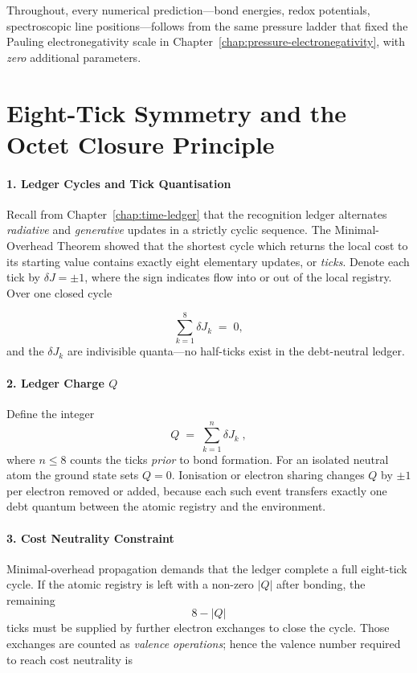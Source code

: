 \documentclass[11pt,oneside]{book}
\begin{document}
Throughout, every numerical prediction---bond energies, redox potentials,
spectroscopic line positions---follows from the same pressure ladder that
fixed the Pauling electronegativity scale in
Chapter~\ref{chap:pressure-electronegativity}, with \emph{zero} additional
parameters.

\bigskip

\section{Eight-Tick Symmetry and the Octet Closure Principle}
\label{sec:octet-proof}

\paragraph*{1. Ledger Cycles and Tick Quantisation}

Recall from Chapter~\ref{chap:time-ledger} that the recognition ledger
alternates \emph{radiative} and \emph{generative} updates in a strictly
cyclic sequence.  The Minimal-Overhead Theorem showed that the shortest
cycle which returns the local cost to its starting value contains exactly
eight elementary updates, or \emph{ticks}.  Denote each tick by
\(\delta J = \pm 1\), where the sign indicates flow into or out of the
local registry.  Over one closed cycle

\[
   \sum_{k=1}^{8} \delta J_k \;=\; 0 ,
\]
and the \(\delta J_k\) are indivisible quanta---no half-ticks exist in the
debt-neutral ledger.

\paragraph*{2. Ledger Charge \(Q\)}

Define the integer
\[
   Q \;=\; \sum_{k=1}^{n} \delta J_k \;,
\]
where \(n\le 8\) counts the ticks \emph{prior} to bond formation.  For an
isolated neutral atom the ground state sets \(Q=0\).  Ionisation or
electron sharing changes \(Q\) by \(\pm1\) per electron removed or added,
because each such event transfers exactly one debt quantum between the
atomic registry and the environment.

\paragraph*{3. Cost Neutrality Constraint}

Minimal-overhead propagation demands that the ledger complete a full
eight-tick cycle.  If the atomic registry is left with a non-zero
\(|Q|\) after bonding, the remaining
\[
   8 - |Q|
\]
ticks must be supplied by further electron exchanges to close the cycle.
Those exchanges are counted as \emph{valence operations}; hence the
valence number required to reach cost neutrality is
\end{document}
